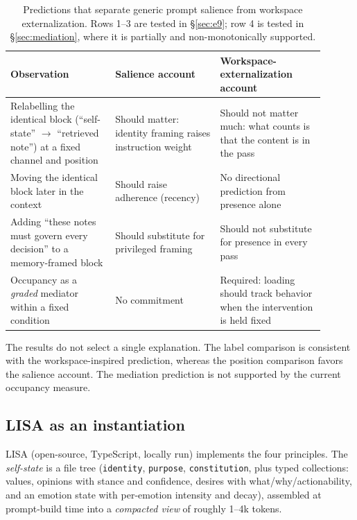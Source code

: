 \documentclass{article}
\begin{document}
\begin{table}[h]
\centering\small
\begin{tabular}{p{0.30\linewidth}p{0.30\linewidth}p{0.30\linewidth}}
\toprule
\textbf{Observation} & \textbf{Salience account} & \textbf{Workspace-externalization account} \\
\midrule
Relabelling the identical block (``self-state'' $\to$ ``retrieved note'') at a fixed channel and position & Should matter: identity framing raises instruction weight & Should not matter much: what counts is that the content is in the pass \\
Moving the identical block later in the context & Should raise adherence (recency) & No directional prediction from presence alone \\
Adding ``these notes must govern every decision'' to a memory-framed block & Should substitute for privileged framing & Should not substitute for presence in every pass \\
Occupancy as a \emph{graded} mediator within a fixed condition & No commitment & Required: loading should track behavior when the intervention is held fixed \\
\bottomrule
\end{tabular}
\caption{Predictions that separate generic prompt salience from workspace externalization. Rows 1--3 are tested in \S\ref{sec:e9}; row 4 is tested in \S\ref{sec:mediation}, where it is partially and non-monotonically supported.}
\label{tab:predictions}
\end{table}

The results do not select a single explanation. The label comparison is consistent with the workspace-inspired prediction, whereas the position comparison favors the salience account. The mediation prediction is not supported by the current occupancy measure.

\subsection{LISA as an instantiation}
\label{sec:lisa}
LISA (open-source, TypeScript, locally run) implements the four principles. The \emph{self-state} is a file tree (\texttt{identity}, \texttt{purpose}, \texttt{constitution}, plus typed collections: values, opinions with stance and confidence, desires with what/why/actionability, and an emotion state with per-emotion intensity and decay), assembled at prompt-build time into a \emph{compacted view} of roughly 1--4k tokens.
\end{document}
